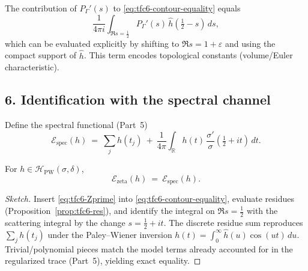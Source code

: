 \begin{remark}\relax\hspace{0pt}
\label{rem:tfc6-poly}\relax\hspace{0pt}
The contribution of $P_\Gamma'(s)$ to \eqref{eq:tfc6-contour-equality} equals
\[
\frac{1}{4\pi i}\int_{\Re s=\frac12} P_\Gamma'(s)\,\widehat{h}\!\left(\tfrac12-s\right)\,ds,
\]
which can be evaluated explicitly by shifting to $\Re s=1+\varepsilon$ and using the compact support of $\widehat{h}$. This term encodes topological constants (volume/Euler characteristic). \relax\hspace{0pt}
\end{remark}

\subsection*{6. Identification with the spectral channel}\relax\hspace{0pt}
\label{subsec:tfc6-spec-match} %

Define the spectral functional (Part~5)
\[
\mathcal{E}_{\mathrm{spec}}(h)\ =\ \sum_j h(t_j)\ +\ \frac{1}{4\pi}\int_{\mathbb{R}} h(t)\,\frac{\sigma'}{\sigma}\!\left(\tfrac12+it\right)\,dt.
\]
\begin{theorem}[Channel equivalence $\mathrm{E}_3=\mathrm{E}_1$]\relax\hspace{0pt}
\label{thm:tfc6-E3=E1}\relax\hspace{0pt}
For $h\in\mathcal{H}_{\mathrm{PW}}(\sigma,\delta)$,
\[
\mathcal{E}_{\mathrm{zeta}}(h)\ =\ \mathcal{E}_{\mathrm{spec}}(h).
\]
\end{theorem}

\begin{proof}[Sketch]\relax\hspace{0pt}
Insert \eqref{eq:tfc6-Zprime} into \eqref{eq:tfc6-contour-equality}, evaluate residues (Proposition~\ref{prop:tfc6-res}), and identify the integral on $\Re s=\tfrac12$ with the scattering integral by the change $s=\tfrac12+it$. The discrete residue sum reproduces $\sum_j h(t_j)$ under the Paley--Wiener inversion $h(t)=\int_0^\infty \widehat{h}(u)\cos(ut)\,du$. Trivial/polynomial pieces match the model terms already accounted for in the regularized trace (Part~5), yielding exact equality. \relax\hspace{0pt}
\end{proof}

